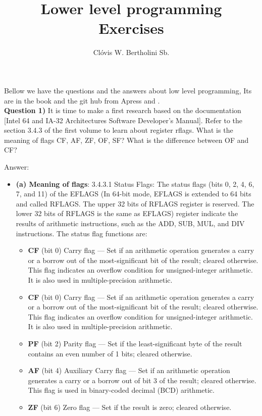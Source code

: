\documentclass[11pt, a4paper]{amsart}
\title{Lower level programming\\Exercises}
\author{Clóvis W. Bertholini Sb.}
\numberwithin{equation}{section}
\theoremstyle{plain} %
\theoremstyle{definition}
\theoremstyle{remark}
\begin{document}
\maketitle
Bellow we have the questions and the answers about low level programming, Its are in the book and the git hub from Apress \cite{zhirkov} and \cite{gitzhirkov}.\\

\textbf{Question 1)} It is time to make a first research based on the documentation [Intel 64 and IA-32 Architectures Software Developer's Manual]. Refer to the section 3.4.3 of the first volume to learn about register rflags. What is the meaning of flags CF, AF, ZF, OF, SF? What is the difference between OF and CF?

Answer:

\begin{itemize}
    \item \textbf{(a) Meaning of flags}: 3.4.3.1  Status Flags: The status flags (bits 0, 2, 4, 6, 7, and 11) of the EFLAGS (In 64-bit mode, EFLAGS is extended to 64 bits and called RFLAGS. The upper 32 bits of RFLAGS register is reserved. The lower 32 bits of RFLAGS is the same as EFLAGS) register indicate the results of arithmetic instructions, such as the ADD, SUB, MUL, and DIV instructions. The status flag functions are:
    \begin{itemize}
        \item \textbf{CF} (bit 0) Carry flag — Set if an arithmetic operation generates a carry or a borrow out of the most-significant bit of the result; cleared otherwise. This flag indicates an overflow condition for unsigned-integer arithmetic. It is also used in multiple-precision arithmetic.
        \item \textbf{CF} (bit 0) Carry flag — Set if an arithmetic operation generates a carry or a borrow out of the most-significant bit of the result; cleared otherwise. This flag indicates an overflow condition for unsigned-integer arithmetic. It is also used in multiple-precision arithmetic.
        \item \textbf{PF} (bit 2) Parity flag — Set if the least-significant byte of the result contains an even number of 1 bits; cleared otherwise.
        \item \textbf{AF} (bit 4) Auxiliary Carry flag — Set if an arithmetic operation generates a carry or a borrow out of bit 3 of the result; cleared otherwise. This flag is used in binary-coded decimal (BCD) arithmetic.
        \item \textbf{ZF} (bit 6) Zero flag — Set if the result is zero; cleared otherwise.

\end{itemize}
\end{itemize}
\end{document}
